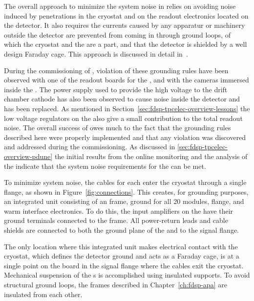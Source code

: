 The overall approach to minimize the system noise in 
relies on avoiding noise induced by penetrations in the cryostat
and on the readout electronics located on the detector. It also
requires the currents caused by any apparatur or machinery outside 
the detector are prevented from coming in through ground loops, of
which the cryostat and the  are a part, and that the
detector is shielded by a well design Faraday cage. This approach
is discussed in detail in~\cite{radekaNoise}. 

During the commissioning of , violation of these
grounding rules have been observed with one of the readout
boards for the , and with the cameras immersed
inside the \lar. The power supply used to provide the high
voltage to the drift chamber cathode has also been observed
to cause noise inside the detector and has been replaced.
As mentioned in Section~\ref{sec:fdsp-tpcelec-overview-lessons}
the low voltage regulators on the  also give
a small contribution to the total readout noise. The overall 
success of  owes much to the fact that the
grounding rules described here were properly implemented
and that any violation was discovered and addressed during
the commissioning. As discussed in \ref{sec:fdsp-tpcelec-overview-pdune}
the initial results from the online monitoring and the
analysis of the  indicate that the system
noise requirements for the  
can be met.

To minimize system noise, the  cables for each  
enter the cryostat through a single  flange, as shown in 
Figure~\ref{fig:connections}. This creates, for grounding purposes, 
an integrated unit consisting of an  frame, 
ground for all \num{20}  modules,  flange, and 
warm interface electronics. To do this, the input amplifiers on the 
  have their ground terminals connected to 
the  frame. All power-return leads and cable shields are 
connected to both the ground plane of the  and to the 
 signal flange.

The only location where this integrated unit makes electrical contact 
with the cryostat, which defines the detector ground and acts as a 
Faraday cage, is at a single point on the  \fdth board in 
the  signal flange where the cables exit the cryostat. 
Mechanical suspension of the s is accomplished using 
insulated supports. To avoid structural ground loops, the  
frames described in Chapter~\ref{ch:fdsp-apa} are insulated from 
each other.

